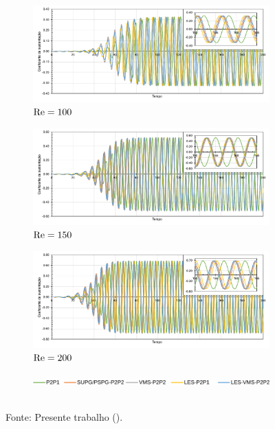 \begin{figure}[h!]
    \centering
    \caption{Escoamento sobre cilindro - Coeficiente de sustentação ao longo do tempo.}
    \begin{subfigure}{\textwidth}
        \includegraphics[width=\linewidth]{Figuras/cylinder/analise3/Cl-100.pdf}
        \caption{$\mathrm{Re}=100$}
    \end{subfigure}
    \begin{subfigure}{\textwidth}
        \includegraphics[width=\linewidth]{Figuras/cylinder/analise3/Cl-150.pdf}
        \caption{$\mathrm{Re}=150$}
    \end{subfigure}
    \begin{subfigure}{\textwidth}
        \includegraphics[width=\linewidth]{Figuras/cylinder/analise3/Cl-200.pdf}
        \caption{$\mathrm{Re}=200$}
    \end{subfigure}
    \begin{subfigure}{.8\textwidth}
        \includegraphics[width=\linewidth]{Figuras/cylinder/legenda.pdf}
    \end{subfigure}
    \\Fonte: Presente trabalho (\the\year).
    \label{fig:cyl-Cl}
\end{figure}

